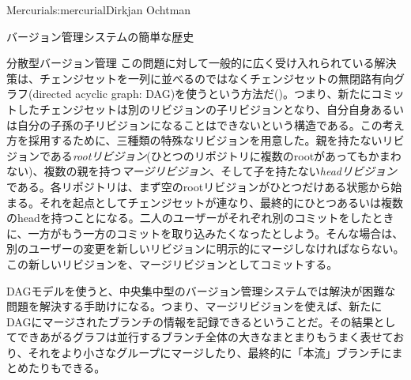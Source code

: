\begin{aosachapter}{Mercurial}{s:mercurial}{Dirkjan Ochtman}
\begin{aosasect1}{バージョン管理システムの簡単な歴史}
\begin{aosasect2}{分散型バージョン管理}
この問題に対して一般的に広く受け入れられている解決策は、チェンジセットを一列に並べるのではなくチェンジセットの無閉路有向グラフ(directed acyclic graph: DAG)を使うという方法だ()。つまり、新たにコミットしたチェンジセットは別のリビジョンの子リビジョンとなり、自分自身あるいは自分の子孫の子リビジョンになることはできないという構造である。この考え方を採用するために、三種類の特殊なリビジョンを用意した。親を持たないリビジョンである\emph{rootリビジョン}(ひとつのリポジトリに複数のrootがあってもかまわない)、複数の親を持つ\emph{マージリビジョン}、そして子を持たない\emph{headリビジョン}である。各リポジトリは、まず空のrootリビジョンがひとつだけある状態から始まる。それを起点としてチェンジセットが連なり、最終的にひとつあるいは複数のheadを持つことになる。二人のユーザーがそれぞれ別のコミットをしたときに、一方がもう一方のコミットを取り込みたくなったとしよう。そんな場合は、別のユーザーの変更を新しいリビジョンに明示的にマージしなければならない。この新しいリビジョンを、マージリビジョンとしてコミットする。


DAGモデルを使うと、中央集中型のバージョン管理システムでは解決が困難な問題を解決する手助けになる。つまり、マージリビジョンを使えば、新たにDAGにマージされたブランチの情報を記録できるということだ。その結果としてできあがるグラフは並行するブランチ全体の大きなまとまりもうまく表せており、それをより小さなグループにマージしたり、最終的に「本流」ブランチにまとめたりもできる。


\end{aosasect2}
\end{aosasect1}
\end{aosachapter}

